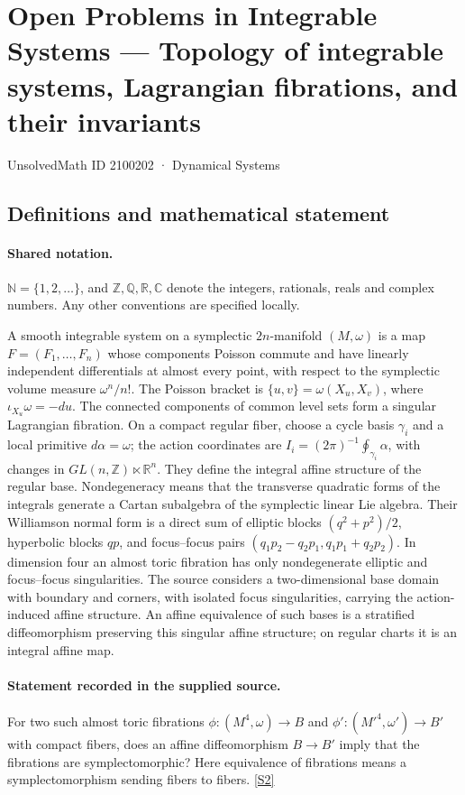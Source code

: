\documentclass[11pt]{article}
\newcommand{\sref}[2]{\hyperlink{source:#1:#2}{[S#2]}}
\begin{document}
\setcounter{section}{2100201}
\section{Open Problems in Integrable Systems — Topology of integrable systems, Lagrangian fibrations, and their invariants}\label{2100202}
{\small\sffamily UnsolvedMath ID 2100202 · Dynamical Systems}
\subsection{Definitions and mathematical statement}

\paragraph{Shared notation.}$\mathbb N=\{1,2,\ldots\}$, and $\mathbb Z,\mathbb Q,\mathbb R,\mathbb C$ denote the integers, rationals, reals and complex numbers. Any other conventions are specified locally.


A smooth integrable system on a symplectic $2n$-manifold $(M,\omega)$ is a map $F=(F_1,\ldots,F_n)$ whose components Poisson commute and have linearly independent differentials at almost every point, with respect to the symplectic volume measure $\omega^n/n!$. The Poisson bracket is $\{u,v\}=\omega(X_u,X_v)$, where $\iota_{X_u}\omega=-du$. The connected components of common level sets form a singular Lagrangian fibration. On a compact regular fiber, choose a cycle basis $\gamma_i$ and a local primitive $d\alpha=\omega$; the action coordinates are $I_i=(2\pi)^{-1}\oint_{\gamma_i}\alpha$, with changes in $GL(n,\mathbb Z)\ltimes\mathbb R^n$. They define the integral affine structure of the regular base. Nondegeneracy means that the transverse quadratic forms of the integrals generate a Cartan subalgebra of the symplectic linear Lie algebra. Their Williamson normal form is a direct sum of elliptic blocks $(q^2+p^2)/2$, hyperbolic blocks $qp$, and focus--focus pairs $(q_1p_2-q_2p_1,q_1p_1+q_2p_2)$. In dimension four an almost toric fibration has only nondegenerate elliptic and focus--focus singularities. The source considers a two-dimensional base domain with boundary and corners, with isolated focus singularities, carrying the action-induced affine structure. An affine equivalence of such bases is a stratified diffeomorphism preserving this singular affine structure; on regular charts it is an integral affine map.
\paragraph{Statement recorded in the supplied source.}
For two such almost toric fibrations $\phi:(M^4,\omega)\to B$ and $\phi':({M'}^4,\omega')\to B'$ with compact fibers, does an affine diffeomorphism $B\to B'$ imply that the fibrations are symplectomorphic? Here equivalence of fibrations means a symplectomorphism sending fibers to fibers. \sref{2100202}{2}
\end{document}
